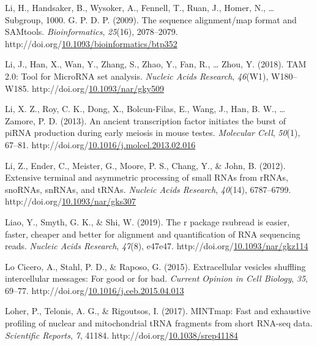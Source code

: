 \documentclass[12pt,twoside]{reedthesis}
\newlength{\cslhangindent}
\newenvironment{CSLReferences}[2] %
 {%
  \setlength{\parindent}{0pt}
  \ifodd #1 \everypar{\setlength{\hangindent}{\cslhangindent}}\ignorespaces\fi
  \ifnum #2 > 0
  \setlength{\parskip}{#2\baselineskip}
  \fi
 }%
 {}
\begin{document}
\begin{CSLReferences}{1}{0}
\leavevmode{}%
Li, H., Handsaker, B., Wysoker, A., Fennell, T., Ruan, J., Homer, N., \ldots{} Subgroup, 1000. G. P. D. P. (2009). The sequence alignment/map format and SAMtools. \emph{Bioinformatics}, \emph{25}(16), 2078--2079. http://doi.org/\href{https://doi.org/10.1093/bioinformatics/btp352}{10.1093/bioinformatics/btp352}

\leavevmode{}%
Li, J., Han, X., Wan, Y., Zhang, S., Zhao, Y., Fan, R., \ldots{} Zhou, Y. (2018). TAM 2.0: Tool for MicroRNA set analysis. \emph{Nucleic Acids Research}, \emph{46}(W1), W180--W185. http://doi.org/\href{https://doi.org/10.1093/nar/gky509}{10.1093/nar/gky509}

\leavevmode{}%
Li, X. Z., Roy, C. K., Dong, X., Bolcun-Filas, E., Wang, J., Han, B. W., \ldots{} Zamore, P. D. (2013). An ancient transcription factor initiates the burst of piRNA production during early meiosis in mouse testes. \emph{Molecular Cell}, \emph{50}(1), 67--81. http://doi.org/\href{https://doi.org/10.1016/j.molcel.2013.02.016}{10.1016/j.molcel.2013.02.016}

\leavevmode{}%
Li, Z., Ender, C., Meister, G., Moore, P. S., Chang, Y., \& John, B. (2012). Extensive terminal and asymmetric processing of small RNAs from rRNAs, snoRNAs, snRNAs, and tRNAs. \emph{Nucleic Acids Research}, \emph{40}(14), 6787--6799. http://doi.org/\href{https://doi.org/10.1093/nar/gks307}{10.1093/nar/gks307}

\leavevmode{}%
Liao, Y., Smyth, G. K., \& Shi, W. (2019). The r package rsubread is easier, faster, cheaper and better for alignment and quantification of RNA sequencing reads. \emph{Nucleic Acids Research}, \emph{47}(8), e47e47. http://doi.org/\href{https://doi.org/10.1093/nar/gkz114}{10.1093/nar/gkz114}

\leavevmode{}%
Lo Cicero, A., Stahl, P. D., \& Raposo, G. (2015). Extracellular vesicles shuffling intercellular messages: For good or for bad. \emph{Current Opinion in Cell Biology}, \emph{35}, 69--77. http://doi.org/\href{https://doi.org/10.1016/j.ceb.2015.04.013}{10.1016/j.ceb.2015.04.013}

\leavevmode{}%
Loher, P., Telonis, A. G., \& Rigoutsos, I. (2017). MINTmap: Fast and exhaustive profiling of nuclear and mitochondrial tRNA fragments from short RNA-seq data. \emph{Scientific Reports}, \emph{7}, 41184. http://doi.org/\href{https://doi.org/10.1038/srep41184}{10.1038/srep41184}


\end{CSLReferences}
\end{document}
